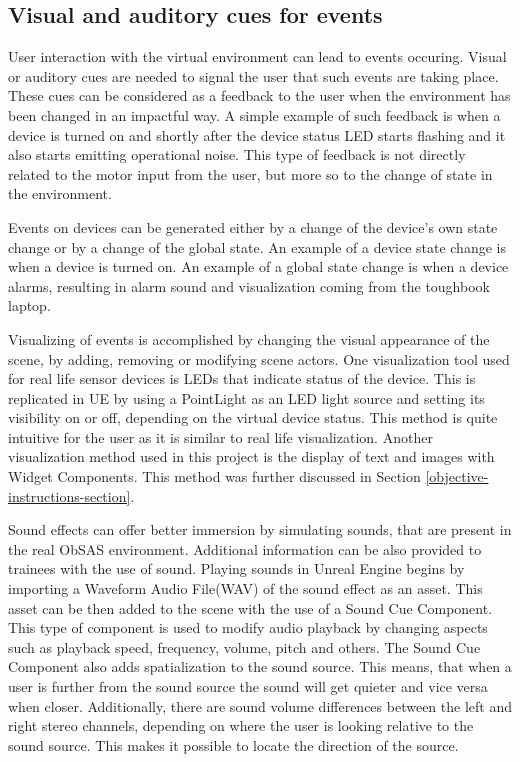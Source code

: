 \documentclass[12pt, a4paper,oneside, nocenter]{thesis}
\begin{document}
\subsection{Visual and auditory cues for events}
User interaction with the virtual environment can lead to events occuring. Visual or auditory cues are needed to signal the user that such events are taking place. These cues can be considered as a feedback to the user when the environment has been changed in an impactful way. A simple example of such feedback is when a device is turned on and shortly after the device status LED starts flashing and it also starts emitting operational noise. This type of feedback is not directly related to the motor input from the user, but more so to the change of state in the environment.
\par
Events on devices can be generated either by a change of the device's own state change or by a change of the global state. An example of a device state change is when a device is turned on. An example of a global state change is when a device alarms, resulting in alarm sound and visualization coming from the toughbook laptop.
\par
Visualizing of events is accomplished by changing the visual appearance of the scene, by adding, removing or modifying scene actors. One visualization tool used for real life sensor devices is LEDs that indicate status of the device. This is replicated in UE by using a PointLight as an LED light source and setting its visibility on or off, depending on the virtual device status. This method is quite intuitive for the user as it is similar to real life visualization. Another visualization method used in this project is the display of text and images with Widget Components. This method was further discussed in Section \ref{objective-instructions-section}.
\par
Sound effects can offer better immersion by simulating sounds, that are present in the real ObSAS environment. Additional information can be also provided to trainees with the use of sound. Playing sounds in Unreal Engine begins by importing a Waveform Audio File(WAV) of the sound effect as an asset. This asset can be then added to the scene with the use of a Sound Cue Component. This type of component is used to modify audio playback by changing aspects such as playback speed, frequency, volume, pitch and others. The Sound Cue Component also adds spatialization to the sound source. This means, that when a user is further from the sound source the sound will get quieter and vice versa when closer. Additionally, there are sound volume differences between the left and right stereo channels, depending on where the user is looking relative to the sound source. This makes it possible to locate the direction of the source.
\end{document}
